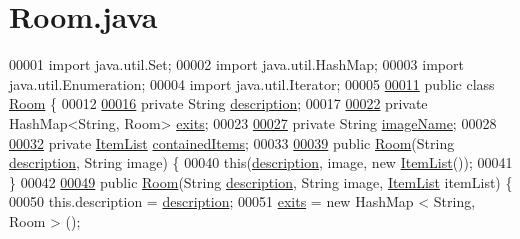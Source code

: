 \hypertarget{Room_8java_source}{\section{Room.\-java}
}

\begin{DoxyCode}
00001 \textcolor{keyword}{import} java.util.Set;
00002 \textcolor{keyword}{import} java.util.HashMap;
00003 \textcolor{keyword}{import} java.util.Enumeration;
00004 \textcolor{keyword}{import} java.util.Iterator;
00005 
\hypertarget{Room_8java_source_l00011}{}\hyperlink{classRoom}{00011} \textcolor{keyword}{public} \textcolor{keyword}{class }\hyperlink{classRoom}{Room} \{
00012 
\hypertarget{Room_8java_source_l00016}{}\hyperlink{classRoom_a2d7ecf802690a6b13750ca6fa6882d77}{00016}     \textcolor{keyword}{private} String \hyperlink{classRoom_a2d7ecf802690a6b13750ca6fa6882d77}{description};
00017 
\hypertarget{Room_8java_source_l00022}{}\hyperlink{classRoom_a29620da10d44de49ee8557e037f014af}{00022}     \textcolor{keyword}{private} HashMap<String, Room> \hyperlink{classRoom_a29620da10d44de49ee8557e037f014af}{exits};
00023 
\hypertarget{Room_8java_source_l00027}{}\hyperlink{classRoom_a3ddf7c120b54509c43d803d2409158fc}{00027}     \textcolor{keyword}{private} String \hyperlink{classRoom_a3ddf7c120b54509c43d803d2409158fc}{imageName};
00028 
\hypertarget{Room_8java_source_l00032}{}\hyperlink{classRoom_a02eea1285ab8d50a2e25cc98d50b185d}{00032}     \textcolor{keyword}{private} \hyperlink{classItemList}{ItemList} \hyperlink{classRoom_a02eea1285ab8d50a2e25cc98d50b185d}{containedItems};
00033 
\hypertarget{Room_8java_source_l00039}{}\hyperlink{classRoom_a2cdcbb3d86746330a5a01c7fae4de02c}{00039}     \textcolor{keyword}{public} \hyperlink{classRoom_a2cdcbb3d86746330a5a01c7fae4de02c}{Room}(String \hyperlink{classRoom_a2d7ecf802690a6b13750ca6fa6882d77}{description}, String image) \{
00040         \textcolor{keyword}{this}(\hyperlink{classRoom_a2d7ecf802690a6b13750ca6fa6882d77}{description}, image, \textcolor{keyword}{new} \hyperlink{classItemList}{ItemList}());
00041     \}
00042 
\hypertarget{Room_8java_source_l00049}{}\hyperlink{classRoom_ad8cb507b670aec86cf14baa25fadb0f2}{00049}     \textcolor{keyword}{public} \hyperlink{classRoom_ad8cb507b670aec86cf14baa25fadb0f2}{Room}(String \hyperlink{classRoom_a2d7ecf802690a6b13750ca6fa6882d77}{description}, String image, \hyperlink{classItemList}{ItemList} itemList) \{
00050         this.description = \hyperlink{classRoom_a2d7ecf802690a6b13750ca6fa6882d77}{description};
00051         \hyperlink{classRoom_a29620da10d44de49ee8557e037f014af}{exits} = \textcolor{keyword}{new} HashMap < String, Room > ();

\end{DoxyCode}
